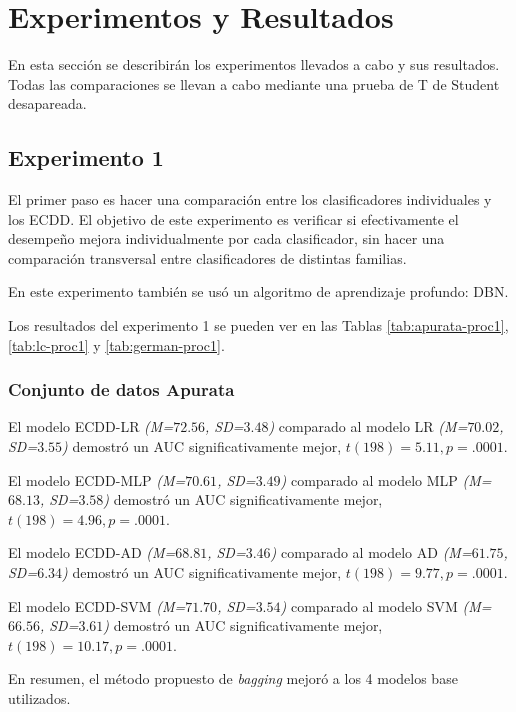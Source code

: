 \chapter{Experimentos y Resultados}

En esta sección se describirán los experimentos llevados a cabo y sus resultados. Todas las comparaciones se llevan a cabo mediante una prueba de T de Student desapareada.


\section{Experimento 1} %

El primer paso es hacer una comparación entre los clasificadores individuales y los \ac{ECDD}. El objetivo de este experimento es verificar si efectivamente el desempeño mejora individualmente por cada clasificador, sin hacer una comparación transversal entre clasificadores de distintas familias.

En este experimento también se usó un algoritmo de aprendizaje profundo: \ac{DBN}.

Los resultados del experimento 1 se pueden ver en las Tablas \ref{tab:apurata-proc1}, \ref{tab:lc-proc1} y \ref{tab:german-proc1}.


\subsection{Conjunto de datos Apurata}

El modelo ECDD-LR \textit{(M=$72.56$, SD=$3.48$)} comparado al modelo \ac{LR} \textit{(M=$70.02$, SD=$3.55$)} demostró un \ac{AUC} significativamente mejor, $t(198)=5.11, p=.0001$.

El modelo ECDD-MLP \textit{(M=$70.61$, SD=$3.49$)} comparado al modelo \ac{MLP} \textit{(M=$68.13$, SD=$3.58$)} demostró un \ac{AUC} significativamente mejor, $t(198)=4.96, p=.0001$.

El modelo ECDD-AD \textit{(M=$68.81$, SD=$3.46$)} comparado al modelo \ac{AD} \textit{(M=$61.75$, SD=$6.34$)} demostró un \ac{AUC} significativamente mejor, $t(198)=9.77, p=.0001$.

El modelo ECDD-SVM \textit{(M=$71.70$, SD=$3.54$)} comparado al modelo \ac{SVM} \textit{(M=$66.56$, SD=$3.61$)} demostró un \ac{AUC} significativamente mejor, $t(198)=10.17, p=.0001$.

En resumen, el método propuesto de \textit{bagging} mejoró a los 4 modelos base utilizados.

